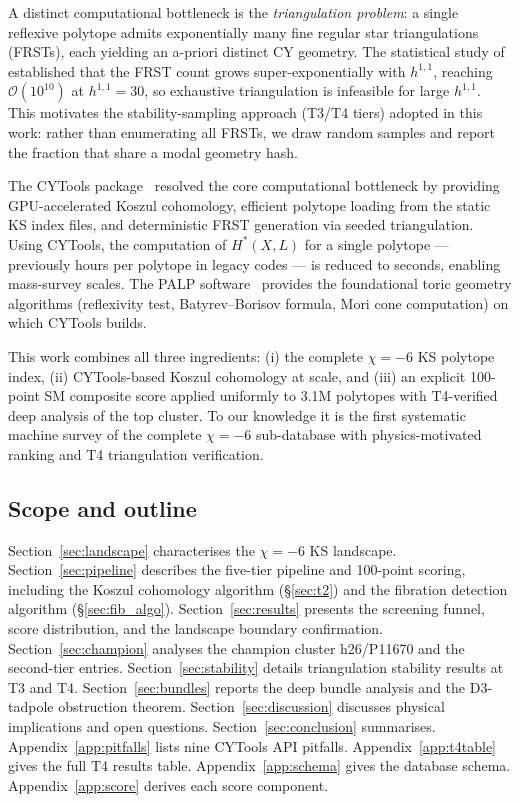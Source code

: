 \documentclass[11pt,a4paper]{article}
\begin{document}
A distinct computational bottleneck is the \emph{triangulation problem}:
a single reflexive polytope admits exponentially many fine regular star
triangulations (FRSTs), each yielding an a-priori distinct CY geometry.
The statistical study of~\cite{AltmanCarifio2021} established that the
FRST count grows super-exponentially with $h^{1,1}$, reaching
$\mathcal{O}(10^{10})$ at $h^{1,1}=30$, so exhaustive triangulation
is infeasible for large $h^{1,1}$.
This motivates the stability-sampling approach (T3/T4 tiers)
adopted in this work: rather than enumerating all FRSTs, we draw
random samples and report the fraction that share a modal geometry hash.

The CYTools package~\cite{CYTools2022} resolved the core computational
bottleneck by providing GPU-accelerated Koszul cohomology, efficient
polytope loading from the static KS index files, and deterministic
FRST generation via seeded triangulation.
Using CYTools, the computation of $H^*(X,L)$ for a single polytope
--- previously hours per polytope in legacy codes --- is reduced to
seconds, enabling mass-survey scales.
The PALP software~\cite{PALP} provides the foundational toric geometry
algorithms (reflexivity test, Batyrev--Borisov formula, Mori cone
computation) on which CYTools builds.

This work combines all three ingredients: (i) the complete
$\chi=-6$ KS polytope index, (ii) CYTools-based Koszul cohomology
at scale, and (iii) an explicit 100-point SM composite score applied
uniformly to 3.1M polytopes with T4-verified deep analysis of the
top cluster.
To our knowledge it is the first systematic machine survey of the
complete $\chi=-6$ sub-database with physics-motivated ranking and
T4 triangulation verification.

\subsection{Scope and outline}

Section~\ref{sec:landscape} characterises the $\chi=-6$ KS landscape.
Section~\ref{sec:pipeline} describes the five-tier pipeline and
100-point scoring, including the Koszul cohomology algorithm (§\ref{sec:t2})
and the fibration detection algorithm (§\ref{sec:fib_algo}).
Section~\ref{sec:results} presents the screening funnel, score
distribution, and the landscape boundary confirmation.
Section~\ref{sec:champion} analyses the champion cluster
h26/P11670 and the second-tier entries.
Section~\ref{sec:stability} details triangulation stability results
at T3 and T4.
Section~\ref{sec:bundles} reports the deep bundle analysis and the
D3-tadpole obstruction theorem.
Section~\ref{sec:discussion} discusses physical implications and
open questions.
Section~\ref{sec:conclusion} summarises.
Appendix~\ref{app:pitfalls} lists nine CYTools API pitfalls.
Appendix~\ref{app:t4table} gives the full T4 results table.
Appendix~\ref{app:schema} gives the database schema.
Appendix~\ref{app:score} derives each score component.
\end{document}
